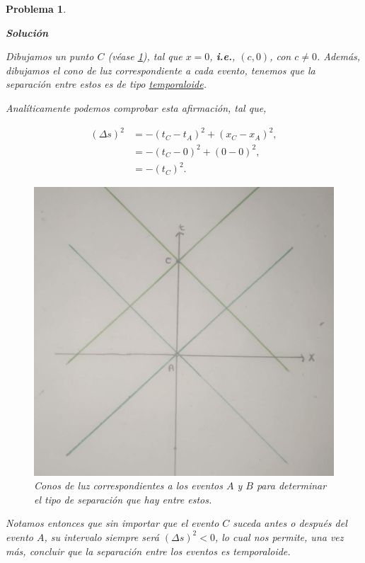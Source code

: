 \documentclass[12pt]{article}
\theoremstyle{break}
\newtheorem{exercise}{Problema}
\theoremstyle{nonumberbreak}
\newcommand*{\inlinesol}{\vspace*{10pt}\textbf{Solución}\vspace*{10pt}}
\begin{document}
\begin{exercise}
\begin{enumerate}[label = \alph*)]
            \inlinesol

            Dibujamos un punto \(C\) (véase \cref{fig:ABIntervalInO}), tal que \(x = 0\), \textbf{i.e.}, \((c, 0)\), con \(c \neq 0\). Además, dibujamos el cono de luz correspondiente a cada evento, tenemos que la separación entre estos es de tipo \ul{temporaloide}.

            Analíticamente podemos comprobar esta afirmación, tal que,
            
            \begin{align*}
                (\Delta s)^{2} &= -(t_{C} - t_{A})^{2} + (x_{C} - x_{A})^{2},\\
                &= -(t_{C} - 0)^{2} + (0 - 0)^{2},\\
                &= -(t_{C})^{2}.
            \end{align*}

            \begin{figure}[htb]
                \centering
                \includegraphics[scale = 0.15]{fig-2.5.pdf}
                \caption{Conos de luz correspondientes a los eventos \(A\) y \(B\) para determinar el tipo de separación que hay entre estos.}
                \label{fig:ABIntervalInO}
            \end{figure}

            Notamos entonces que sin importar que el evento \(C\) suceda antes o después del evento \(A\), su intervalo siempre será \((\Delta s)^{2} < 0\), lo cual nos permite, una vez más, concluir que la separación entre los eventos es temporaloide. 


\end{enumerate}
\end{exercise}
\end{document}
